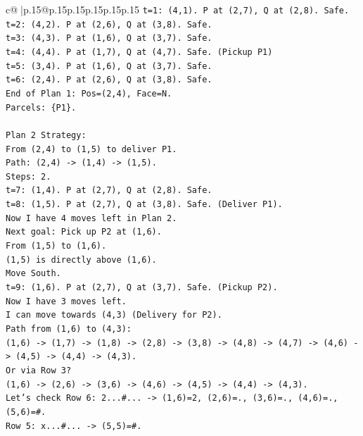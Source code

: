 \documentclass{article}
\begin{document}
{\begin{supertabular}{c@{$\;$}|p{.15\linewidth}@{}p{.15\linewidth}p{.15\linewidth}p{.15\linewidth}p{.15\linewidth}p{.15\linewidth}}
{{{\texttt{t=1: (4,1). P at (2,7), Q at (2,8). Safe.} \\
\texttt{t=2: (4,2). P at (2,6), Q at (3,8). Safe.} \\
\texttt{t=3: (4,3). P at (1,6), Q at (3,7). Safe.} \\
\texttt{t=4: (4,4). P at (1,7), Q at (4,7). Safe. (Pickup P1)} \\
\texttt{t=5: (3,4). P at (1,6), Q at (3,7). Safe.} \\
\texttt{t=6: (2,4). P at (2,6), Q at (3,8). Safe.} \\
\texttt{End of Plan 1: Pos=(2,4), Face=N.} \\
\texttt{Parcels: \{P1\}.} \\
\\ 
\texttt{Plan 2 Strategy:} \\
\texttt{From (2,4) to (1,5) to deliver P1.} \\
\texttt{Path: (2,4) {-}> (1,4) {-}> (1,5).} \\
\texttt{Steps: 2.} \\
\texttt{t=7: (1,4). P at (2,7), Q at (2,8). Safe.} \\
\texttt{t=8: (1,5). P at (2,7), Q at (3,8). Safe. (Deliver P1).} \\
\texttt{Now I have 4 moves left in Plan 2.} \\
\texttt{Next goal: Pick up P2 at (1,6).} \\
\texttt{From (1,5) to (1,6).} \\
\texttt{(1,5) is directly above (1,6).} \\
\texttt{Move South.} \\
\texttt{t=9: (1,6). P at (2,7), Q at (3,7). Safe. (Pickup P2).} \\
\texttt{Now I have 3 moves left.} \\
\texttt{I can move towards (4,3) (Delivery for P2).} \\
\texttt{Path from (1,6) to (4,3):} \\
\texttt{(1,6) {-}> (1,7) {-}> (1,8) {-}> (2,8) {-}> (3,8) {-}> (4,8) {-}> (4,7) {-}> (4,6) {-}> (4,5) {-}> (4,4) {-}> (4,3).} \\
\texttt{Or via Row 3?} \\
\texttt{(1,6) {-}> (2,6) {-}> (3,6) {-}> (4,6) {-}> (4,5) {-}> (4,4) {-}> (4,3).} \\
\texttt{Let's check Row 6: 2...\#... {-}> (1,6)=2, (2,6)=., (3,6)=., (4,6)=., (5,6)=\#.} \\
\texttt{Row 5: x...\#... {-}> (5,5)=\#.} \\
}}}
\end{supertabular}}
\end{document}
